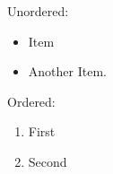 \documentclass[a4paper]{article}
\begin{document}
Unordered:

\begin{itemize}
\item Item
\item Another Item.
\end{itemize}

Ordered:

\begin{enumerate}
\item First
\item Second
\end{enumerate}
\end{document}
